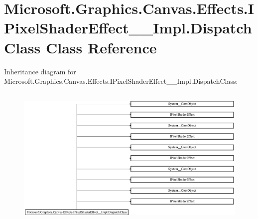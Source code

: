 \hypertarget{class_microsoft_1_1_graphics_1_1_canvas_1_1_effects_1_1_i_pixel_shader_effect_____impl_1_1_dispatch_class}{}\section{Microsoft.\+Graphics.\+Canvas.\+Effects.\+I\+Pixel\+Shader\+Effect\+\_\+\+\_\+\+Impl.\+Dispatch\+Class Class Reference}
\label{class_microsoft_1_1_graphics_1_1_canvas_1_1_effects_1_1_i_pixel_shader_effect_____impl_1_1_dispatch_class}
Inheritance diagram for Microsoft.\+Graphics.\+Canvas.\+Effects.\+I\+Pixel\+Shader\+Effect\+\_\+\+\_\+\+Impl.\+Dispatch\+Class\+:\begin{figure}[H]
\begin{center}
\leavevmode
\includegraphics[height=6.905830cm]{class_microsoft_1_1_graphics_1_1_canvas_1_1_effects_1_1_i_pixel_shader_effect_____impl_1_1_dispatch_class}
\end{center}
\end{figure}
